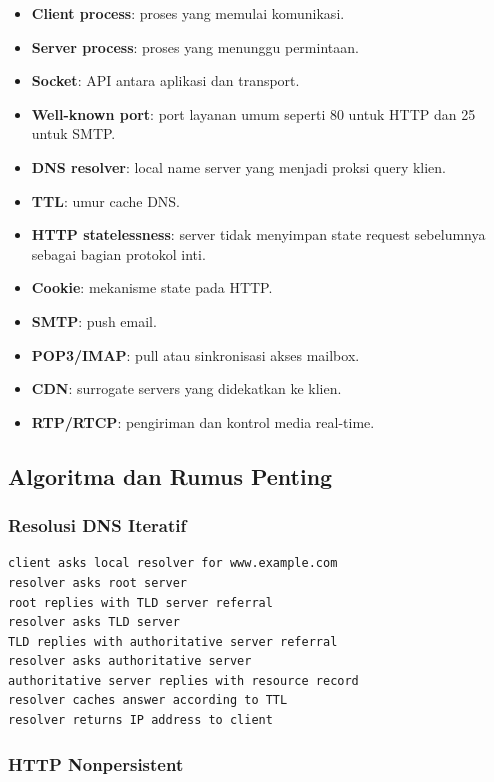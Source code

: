 \begin{itemize}
    \item \textbf{Client process}: proses yang memulai komunikasi.
    \item \textbf{Server process}: proses yang menunggu permintaan.
    \item \textbf{Socket}: API antara aplikasi dan transport.
    \item \textbf{Well-known port}: port layanan umum seperti 80 untuk HTTP dan 25 untuk SMTP.
    \item \textbf{DNS resolver}: local name server yang menjadi proksi query klien.
    \item \textbf{TTL}: umur cache DNS.
    \item \textbf{HTTP statelessness}: server tidak menyimpan state request sebelumnya sebagai bagian protokol inti.
    \item \textbf{Cookie}: mekanisme state pada HTTP.
    \item \textbf{SMTP}: push email.
    \item \textbf{POP3/IMAP}: pull atau sinkronisasi akses mailbox.
    \item \textbf{CDN}: surrogate servers yang didekatkan ke klien.
    \item \textbf{RTP/RTCP}: pengiriman dan kontrol media real-time.
\end{itemize}

\subsection{Algoritma dan Rumus Penting}

\subsubsection*{Resolusi DNS Iteratif}

\begin{lstlisting}[language={},caption={Resolusi DNS iteratif}]
client asks local resolver for www.example.com
resolver asks root server
root replies with TLD server referral
resolver asks TLD server
TLD replies with authoritative server referral
resolver asks authoritative server
authoritative server replies with resource record
resolver caches answer according to TTL
resolver returns IP address to client
\end{lstlisting}

\subsubsection*{HTTP Nonpersistent}

